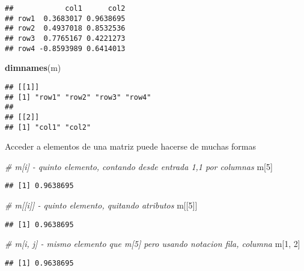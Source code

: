 \documentclass[]{article}
\newenvironment{Shaded}{\begin{snugshade}}{\end{snugshade}}
\newcommand{\KeywordTok}[1]{\textcolor[rgb]{0.13,0.29,0.53}{\textbf{#1}}}
\newcommand{\DecValTok}[1]{\textcolor[rgb]{0.00,0.00,0.81}{#1}}
\newcommand{\CommentTok}[1]{\textcolor[rgb]{0.56,0.35,0.01}{\textit{#1}}}
\newcommand{\NormalTok}[1]{#1}
\begin{document}
\begin{verbatim}
##            col1      col2
## row1  0.3683017 0.9638695
## row2  0.4937018 0.8532536
## row3  0.7765167 0.4221273
## row4 -0.8593989 0.6414013
\end{verbatim}

\begin{Shaded}
\begin{Highlighting}[]
\KeywordTok{dimnames}\NormalTok{(m)}
\end{Highlighting}
\end{Shaded}

\begin{verbatim}
## [[1]]
## [1] "row1" "row2" "row3" "row4"
## 
## [[2]]
## [1] "col1" "col2"
\end{verbatim}

Acceder a elementos de una matriz puede hacerse de muchas formas

\begin{Shaded}
\begin{Highlighting}[]
\CommentTok{# m[i] - quinto elemento, contando desde entrada 1,1 por columnas}
\NormalTok{m[}\DecValTok{5}\NormalTok{]}
\end{Highlighting}
\end{Shaded}

\begin{verbatim}
## [1] 0.9638695
\end{verbatim}

\begin{Shaded}
\begin{Highlighting}[]
\CommentTok{# m[[i]] - quinto elemento, quitando atributos}
\NormalTok{m[[}\DecValTok{5}\NormalTok{]]}
\end{Highlighting}
\end{Shaded}

\begin{verbatim}
## [1] 0.9638695
\end{verbatim}

\begin{Shaded}
\begin{Highlighting}[]
\CommentTok{# m[i, j] - mismo elemento que m[5] pero usando notacion fila, columna}
\NormalTok{m[}\DecValTok{1}\NormalTok{, }\DecValTok{2}\NormalTok{]}
\end{Highlighting}
\end{Shaded}

\begin{verbatim}
## [1] 0.9638695
\end{verbatim}
\end{document}
